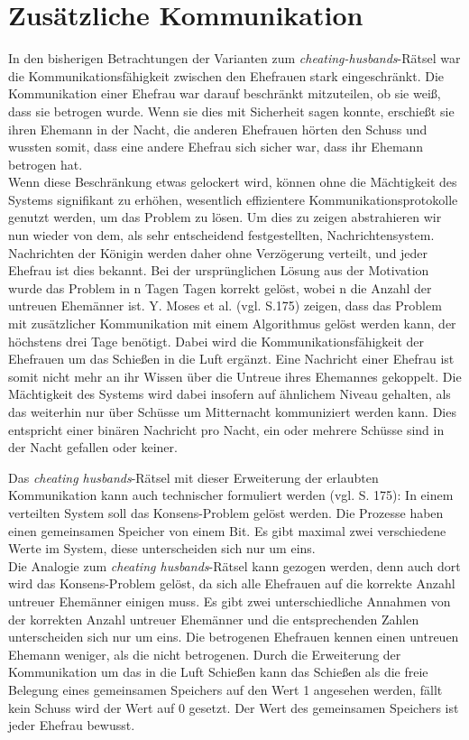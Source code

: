 \section{Zusätzliche Kommunikation}
\label{Kommuniaktion}
In den bisherigen Betrachtungen der Varianten zum \textit{cheating-husbands}-Rätsel war die Kommunikationsfähigkeit zwischen den Ehefrauen stark eingeschränkt.
Die Kommunikation einer Ehefrau war darauf beschränkt mitzuteilen, ob sie weiß, dass sie betrogen wurde. 
Wenn sie dies mit Sicherheit sagen konnte, erschießt sie ihren Ehemann in der Nacht, die anderen Ehefrauen hörten den Schuss und wussten somit, dass eine andere Ehefrau sich sicher war, dass ihr Ehemann betrogen hat.\\
Wenn diese Beschränkung etwas gelockert wird, können ohne die Mächtigkeit des Systems signifikant zu erhöhen, wesentlich effizientere Kommunikationsprotokolle genutzt werden, um das Problem zu lösen.
Um dies zu zeigen abstrahieren wir nun wieder von dem, als sehr entscheidend festgestellten, Nachrichtensystem. 
Nachrichten der Königin werden daher ohne Verzögerung verteilt, und jeder Ehefrau ist dies bekannt.
Bei der ursprünglichen Lösung aus der Motivation wurde das Problem in n Tagen Tagen korrekt gelöst, wobei n die Anzahl der untreuen Ehemänner ist.
Y. Moses et al. \cite{moses1986cheating} (vgl. S.175) zeigen, dass das Problem mit zusätzlicher Kommunikation mit einem Algorithmus gelöst werden kann, der höchstens drei Tage benötigt. Dabei wird die Kommunikationsfähigkeit der Ehefrauen um das Schießen in die Luft ergänzt. Eine \glqq Nachricht\grqq{} einer Ehefrau ist somit nicht mehr an ihr Wissen über die Untreue ihres Ehemannes gekoppelt.
Die Mächtigkeit des Systems wird dabei insofern auf ähnlichem Niveau gehalten, als das weiterhin nur über Schüsse um Mitternacht kommuniziert werden kann. Dies entspricht einer binären Nachricht pro Nacht, ein oder mehrere Schüsse sind in der Nacht gefallen oder keiner.\medskip

Das \textit{cheating husbands}-Rätsel mit dieser Erweiterung der erlaubten Kommunikation kann auch technischer formuliert werden (vgl. \cite{moses1986cheating} S. 175): 
In einem verteilten System soll das Konsens-Problem gelöst werden. Die Prozesse haben einen gemeinsamen Speicher von einem Bit. Es gibt maximal zwei verschiedene Werte im System, diese unterscheiden sich nur um eins.\\
Die Analogie zum \textit{cheating husbands}-Rätsel kann gezogen werden, denn auch dort wird das Konsens-Problem gelöst, da sich alle Ehefrauen auf die korrekte Anzahl untreuer Ehemänner einigen muss.
Es gibt zwei unterschiedliche Annahmen von der korrekten Anzahl untreuer Ehemänner und die entsprechenden Zahlen unterscheiden sich nur um eins. Die betrogenen Ehefrauen kennen einen untreuen Ehemann weniger, als die nicht betrogenen.
Durch die Erweiterung der Kommunikation um das in die Luft Schießen kann das Schießen als die freie Belegung eines gemeinsamen Speichers auf den Wert 1 angesehen werden, fällt kein Schuss wird der Wert auf 0 gesetzt.
Der Wert des gemeinsamen Speichers ist jeder Ehefrau bewusst.
\medskip

